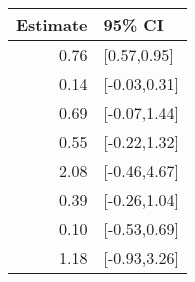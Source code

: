 \begin{tabular}{rl}
  \hline
Estimate & 95\% CI \\ 
  \hline
0.76 & [0.57,0.95] \\ 
  0.14 & [-0.03,0.31] \\ 
  0.69 & [-0.07,1.44] \\ 
  0.55 & [-0.22,1.32] \\ 
  2.08 & [-0.46,4.67] \\ 
  0.39 & [-0.26,1.04] \\ 
  0.10 & [-0.53,0.69] \\ 
  1.18 & [-0.93,3.26] \\ 
   \hline
\end{tabular}

